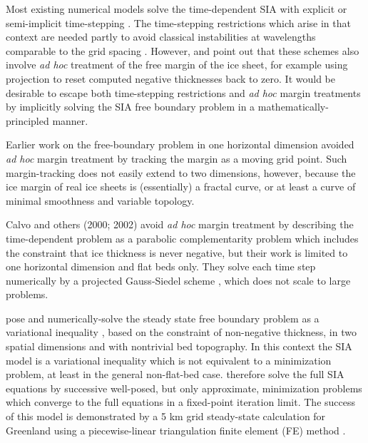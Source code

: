 \documentclass[twocolumn,letterpaper]{igs}
\begin{document}
Most existing numerical models solve the time-dependent SIA with explicit or semi-implicit time-stepping  \citep{Bueleretal2005,EgholmNielsen2010,HindmarshPayne1996,Huybrechtsetal1996,JaroschSchoofAnslow2013}.  The time-stepping restrictions which arise in that context are needed partly to avoid classical instabilities at wavelengths comparable to the grid spacing \citep{MortonMayers2005}.  However, \cite{Bueleretal2005} and \cite{JaroschSchoofAnslow2013} point out that these schemes also involve \emph{ad hoc} treatment of the free margin of the ice sheet, for example using projection to reset computed negative thicknesses back to zero.  It would be desirable to escape both time-stepping restrictions and \emph{ad hoc} margin treatments by implicitly solving the SIA free boundary problem in a mathematically-principled manner.

Earlier work on the free-boundary problem in one horizontal dimension \citep{Hindmarshetal1987,HindmarshHutter1988} avoided \emph{ad hoc} margin treatment by tracking the margin as a moving grid point.  Such margin-tracking does not easily extend to two dimensions, however, because the ice margin of real ice sheets is (essentially) a fractal curve, or at least a curve of minimal smoothness and variable topology.

Calvo and others (2000; 2002)\nocite{CalvoDuranyVazquez2000,Calvoetal2002} avoid \emph{ad hoc} margin treatment by describing the time-dependent problem as a parabolic complementarity problem which includes the constraint that ice thickness is never negative, but their work is limited to one horizontal dimension and flat beds only.  They solve each time step numerically by a projected Gauss-Siedel scheme \citep{Ciarlet2002}, which does not scale to large problems.  

\cite{JouvetBueler2012} pose and numerically-solve the steady state free boundary problem as a variational inequality \citep{KinderlehrerStampacchia1980}, based on the constraint of non-negative thickness, in two spatial dimensions and with nontrivial bed topography.  In this context the SIA model is a variational inequality which is not equivalent to a minimization problem, at least in the general non-flat-bed case.  \cite{JouvetBueler2012} therefore solve the full SIA equations by successive well-posed, but only approximate, minimization problems which converge to the full equations in a fixed-point iteration limit.  The success of this model is demonstrated by a 5 km grid steady-state calculation for Greenland using a piecewise-linear triangulation finite element (FE) method \citep{Elmanetal2005}.
\end{document}
